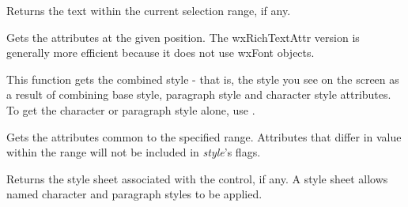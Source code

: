 
Returns the text within the current selection range, if any.

\label{wxrichtextctrlgetstyle}




Gets the attributes at the given position. The wxRichTextAttr version is generally more efficient
because it does not use wxFont objects.

This function gets the combined style - that is, the style you see on the screen as a result
of combining base style, paragraph style and character style attributes. To get the character
or paragraph style alone, use .

\label{wxrichtextctrlgetstyleforrange}



Gets the attributes common to the specified range. Attributes that differ in value within the range will
not be included in {\it style}'s flags.

\label{wxrichtextctrlgetstylesheet}


Returns the style sheet associated with the control, if any. A style sheet allows named
character and paragraph styles to be applied.

\label{wxrichtextctrlgetuncombinedstyle}




